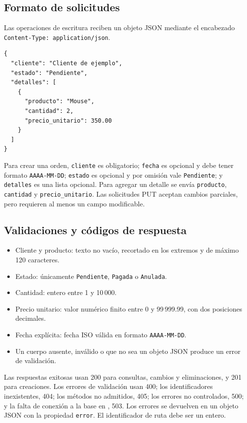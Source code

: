 \documentclass[11pt,a4paper]{article}
\newcommand{\codigo}[1]{\texttt{\detokenize{#1}}}
\begin{document}
\subsection{Formato de solicitudes}

Las operaciones de escritura reciben un objeto JSON mediante el encabezado \texttt{Content-Type: application/json}.

\begin{lstlisting}
{
  "cliente": "Cliente de ejemplo",
  "estado": "Pendiente",
  "detalles": [
    {
      "producto": "Mouse",
      "cantidad": 2,
      "precio_unitario": 350.00
    }
  ]
}
\end{lstlisting}

Para crear una orden, \texttt{cliente} es obligatorio; \texttt{fecha} es opcional y debe tener formato \texttt{AAAA-MM-DD}; \texttt{estado} es opcional y por omisión vale \texttt{Pendiente}; y \texttt{detalles} es una lista opcional. Para agregar un detalle se envía \texttt{producto}, \texttt{cantidad} y \texttt{precio\_unitario}. Las solicitudes PUT aceptan cambios parciales, pero requieren al menos un campo modificable.

\subsection{Validaciones y códigos de respuesta}
\begin{itemize}
    \item Cliente y producto: texto no vacío, recortado en los extremos y de máximo 120 caracteres.
    \item Estado: únicamente \texttt{Pendiente}, \texttt{Pagada} o \texttt{Anulada}.
    \item Cantidad: entero entre 1 y 10\,000.
    \item Precio unitario: valor numérico finito entre 0 y 99\,999.99, con dos posiciones decimales.
    \item Fecha explícita: fecha ISO válida en formato \texttt{AAAA-MM-DD}.
    \item Un cuerpo ausente, inválido o que no sea un objeto JSON produce un error de validación.
\end{itemize}

Las respuestas exitosas usan 200 para consultas, cambios y eliminaciones, y 201 para creaciones. Los errores de validación usan 400; los identificadores inexistentes, 404; los métodos no admitidos, 405; los errores no controlados, 500; y la falta de conexión a la base en \codigo{/health}, 503. Los errores se devuelven en un objeto JSON con la propiedad \texttt{error}. El identificador de ruta debe ser un entero.
\end{document}
